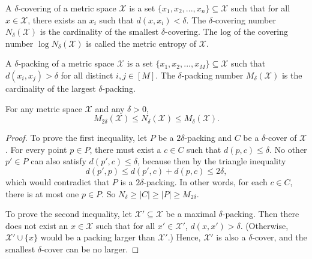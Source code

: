 \documentclass[../main.tex]{subfiles}
\newcommand{\set}[1]{\mathcal {#1}}
\newcommand{\dist}[2]{\distf({#1},{#2})}
\newcommand{\distf}{d}
\begin{document}

\begin{definition}
    A $\delta$-covering of a metric space $\set X$ is a set $\{x_1,x_2,...,x_n\} \subseteq \set X$ such that for all $x\in\set X$, there exists an $x_i$ such that $\dist{x}{x_i} < \delta$.
    The $\delta$-covering number $N_\delta(\set X)$ is the cardinality of the smallest $\delta$-covering.
    The log of the covering number $\log N_\delta(\set X)$ is called the metric entropy of $\set X$.
\end{definition}

\begin{definition}
A $\delta$-packing of a metric space $\set X$ is a set $\{x_1,x_2,...,x_M\} \subseteq \set X$ such that $\dist{x_i}{x_j} > \delta$ for all distinct $i,j\in[M]$.
The $\delta$-packing number $M_\delta (\set X)$ is the cardinality of the largest $\delta$-packing.
\end{definition}

\begin{lemma}
    \label{lemma:coverpacking}
    For any metric space $\set X$ and any $\delta>0$,
    \begin{equation}
        M_{2\delta}(\set X) \le N_\delta(\set X) \le M_{\delta}(\set X)
        .
    \end{equation}
\end{lemma}

\begin{proof}
    To prove the first inequality, let $P$ be a $2\delta$-packing and $C$ be a $\delta$-cover of $\set X$.
    For every point $p\in P$, there must exist a $c\in C$ such that $\dist{p}{c}\le\delta$.
    No other $p'\in P$ can also satisfy $\dist{p'}{c}\le\delta$, because then by the triangle inequality
    \begin{equation}
        \dist{p'}{p} \le \dist{p'}{c}+\dist{p}{c} \le 2\delta
        ,
    \end{equation}
    which would contradict that $P$ is a $2\delta$-packing.
    In other words, for each $c\in C$, there is at most one $p\in P$.
    So $N_\delta \ge |C| \ge |P| \ge M_{2\delta}$.

    To prove the second inequality, let $\set X'\subseteq \set X$ be a maximal $\delta$-packing.
    Then there does not exist an $x\in\set X$ such that for all $x'\in\set X'$, 
    $\dist{x}{x'} > \delta$.
    (Otherwise, $\set X' \cup \{x\}$ would be a packing larger than $\set X'$.)
    Hence, $\set X'$ is also a $\delta$-cover,
    and the smallest $\delta$-cover can be no larger.
\end{proof}
\end{document}
